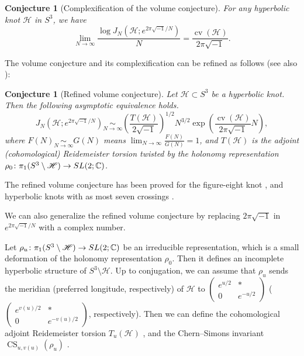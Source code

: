 \documentclass[a4paper,dvipdfmx]{amsart}
\theoremstyle{plain}
\newtheorem{conj}[thm]{Conjecture}
\theoremstyle{definition}
\theoremstyle{remark}
\newcommand{\C}{\mathbb{C}}
\newcommand{\CS}{\operatorname{CS}}
\newcommand{\cv}{\operatorname{cv}}
\newcommand{\SL}{\rm{SL}}
\newcommand{\Khyp}{\mathscr{H}}
\renewcommand{\i}{\sqrt{-1}}
\numberwithin{equation}{section}
\begin{document}
\begin{conj}[Complexification of the volume conjecture]
For any hyperbolic knot $\Khyp$ in $S^3$, we have
\begin{equation*}
  \lim_{N\to\infty}
  \frac{\log J_N(\Khyp;e^{2\pi\i/N})}{N}
  =
  \frac{\cv(\Khyp)}{2\pi\i}.
\end{equation*}
\end{conj}
The volume conjecture and its complexification can be refined as follows \cite{Gukov:COMMP2005} (see also \cite{Gukov/Murakami:FIC2008,Dimofte/Gukov/Lenells/Zagier:CNTP2010,Ohtsuki:QT2016}):
\begin{conj}[Refined volume conjecture]
Let $\Khyp\subset S^3$ be a hyperbolic knot.
Then the following asymptotic equivalence holds.
\begin{equation*}
  J_N(\Khyp;e^{2\pi\i/N})
  \underset{N\to\infty}{\sim}
  \left(\frac{T(\Khyp)}{2\i}\right)^{1/2}N^{3/2}
  \exp\left(\frac{\cv(\Khyp)}{2\pi\i}N\right),
\end{equation*}
where $F(N)\underset{N\to\infty}{\sim}G(N)$ means $\lim_{N\to\infty}\frac{F(N)}{G(N)}=1$, and $T(\Khyp)$ is the adjoint {\rm(}cohomological{\rm)} Reidemeister torsion twisted by the holonomy representation $\rho_0\colon\pi_1(S^3\setminus{\Khyp})\to\SL(2;\C)$.
\end{conj}
The refined volume conjecture has been proved for the figure-eight knot \cite{Andersen/Hansen:JKNOT2006}, and hyperbolic knots with as most seven crossings \cite{Ohtsuki:QT2016,Ohtsuki/Yokota:MATPC2018,Ohtsuki:INTJM62017}.
\par
We can also generalize the refined volume conjecture by replacing $2\pi\i$ in $e^{2\pi\i/N}$ with a complex number.
\par
Let $\rho_u\colon\pi_1(S^3\setminus\Khyp)\to\SL(2;\C)$ be an irreducible representation, which is a small deformation of the holonomy representation $\rho_0$.
Then it defines an incomplete hyperbolic structure of $S^3\setminus\Khyp$.
Up to conjugation, we can assume that $\rho_u$ sends the meridian (preferred longitude, respectively) of $\Khyp$ to $\begin{pmatrix}e^{u/2}&\ast\\0&e^{-u/2}\end{pmatrix}$ ($\begin{pmatrix}e^{v(u)/2}&\ast\\0&e^{-v(u)/2}\end{pmatrix}$, respectively).
Then we can define the cohomological adjoint Reidemeister torsion $T_{u}(\Khyp)$ \cite{Porti:MAMCAU1997}, and the Chern--Simons invariant $\CS_{u,v(u)}(\rho_u)$ \cite{Kirk/Klassen:COMMP1993}.
\end{document}
